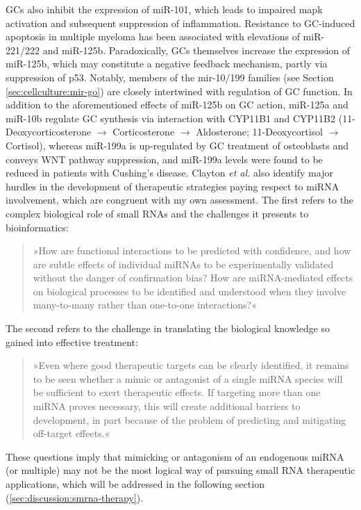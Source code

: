 GCs also inhibit the expression of miR-101, which leads to impaired \acf{mapk} activation and subsequent suppression of inflammation. Resistance to GC-induced apoptosis in multiple myeloma has been associated with elevations of miR-221/222 and miR-125b. Paradoxically, GCs themselves increase the expression of miR-125b, which may constitute a negative feedback mechanism, partly via suppression of p53.\cite{Murray2013} Notably, members of the mir-10/199 families (see Section \ref{sec:cellculture:mir-go}) are closely intertwined with regulation of GC function. In addition to the aforementioned effects of miR-125b on GC action, miR-125a and miR-10b regulate GC synthesis via interaction with CYP11B1 and CYP11B2 (11-Deoxycorticosterone $\to$ Corticosterone $\to$ Aldosterone; 11-Deoxycortisol $\to$ Cortisol), whereas miR-199a is up-regulated by GC treatment of osteoblasts and conveys WNT pathway suppression, and miR-199a levels were found to be reduced in patients with Cushing's disease. Clayton \emph{et al.}\cite{Clayton2018} also identify major hurdles in the development of therapeutic strategies paying respect to miRNA involvement, which are congruent with my own assessment. The first refers to the complex biological role of small RNAs and the challenges it presents to bioinformatics: 

\begin{quote}
»How are functional interactions to be predicted with confidence, and how are subtle effects of individual miRNAs to be experimentally validated without the danger of confirmation bias? How are miRNA-mediated effects on biological processes to be identified and understood when they involve many-to-many rather than one-to-one interactions?«
\end{quote}

The second refers to the challenge in translating the biological knowledge so gained into effective treatment:

\begin{quote}
»Even where good therapeutic targets can be clearly identified, it remains to be seen whether a mimic or antagonist of a single miRNA species will be sufficient to exert therapeutic effects. If targeting more than one miRNA proves necessary, this will create additional barriers to development, in part because of the problem of predicting and mitigating off-target effects.«
\end{quote}

These questions imply that mimicking or antagonism of an endogenous miRNA (or multiple) may not be the most logical way of pursuing small RNA therapeutic applications, which will be addressed in the following section (\ref{sec:discussion:smrna-therapy}).

